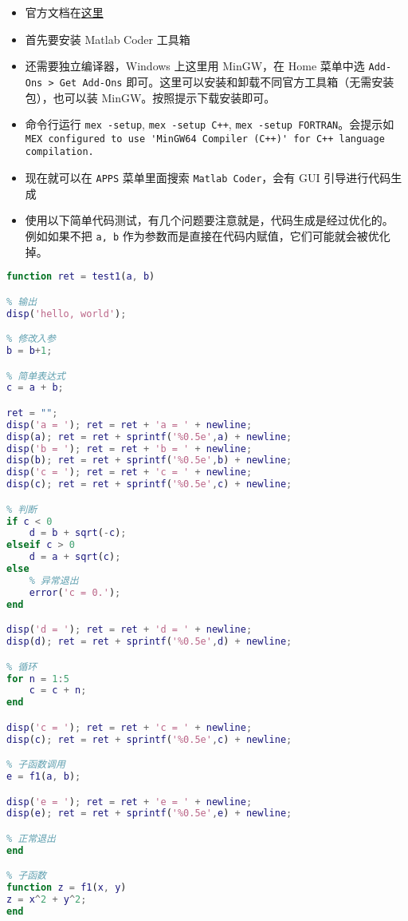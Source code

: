 
\begin{itemize}
\item 官方文档在\href{https://ch.mathworks.com/help/coder/index.html?s_tid=CRUX_lftnav}{这里}
\item 首先要安装 Matlab Coder 工具箱
\item 还需要独立编译器，Windows 上这里用 MinGW，在 Home 菜单中选 \verb`Add-Ons > Get Add-Ons` 即可。这里可以安装和卸载不同官方工具箱（无需安装包），也可以装 MinGW。按照提示下载安装即可。
\item 命令行运行 \verb`mex -setup`, \verb`mex -setup C++`, \verb`mex -setup FORTRAN`。会提示如 \verb`MEX configured to use 'MinGW64 Compiler (C++)' for C++ language compilation.`
\item 现在就可以在 \verb`APPS` 菜单里面搜索 \verb`Matlab Coder`，会有 GUI 引导进行代码生成
\item 使用以下简单代码测试，有几个问题要注意就是，代码生成是经过优化的。 例如如果不把 \verb`a, b` 作为参数而是直接在代码内赋值，它们可能就会被优化掉。
\end{itemize}
\begin{lstlisting}[language=matlab,caption='test1.m']
% 代码生成的入口函数，arg* 限制为字符串，ret 限制为非负整数
function ret = test1(a, b)

% 输出
disp('hello, world');

% 修改入参
b = b+1;

% 简单表达式
c = a + b;

ret = "";
disp('a = '); ret = ret + 'a = ' + newline;
disp(a); ret = ret + sprintf('%0.5e',a) + newline;
disp('b = '); ret = ret + 'b = ' + newline;
disp(b); ret = ret + sprintf('%0.5e',b) + newline;
disp('c = '); ret = ret + 'c = ' + newline;
disp(c); ret = ret + sprintf('%0.5e',c) + newline;

% 判断
if c < 0
    d = b + sqrt(-c);
elseif c > 0
    d = a + sqrt(c);
else
    % 异常退出
    error('c = 0.');
end

disp('d = '); ret = ret + 'd = ' + newline;
disp(d); ret = ret + sprintf('%0.5e',d) + newline;

% 循环
for n = 1:5
    c = c + n;
end

disp('c = '); ret = ret + 'c = ' + newline;
disp(c); ret = ret + sprintf('%0.5e',c) + newline;

% 子函数调用
e = f1(a, b);

disp('e = '); ret = ret + 'e = ' + newline;
disp(e); ret = ret + sprintf('%0.5e',e) + newline;

% 正常退出
end

% 子函数
function z = f1(x, y)
z = x^2 + y^2;
end

\end{lstlisting}

